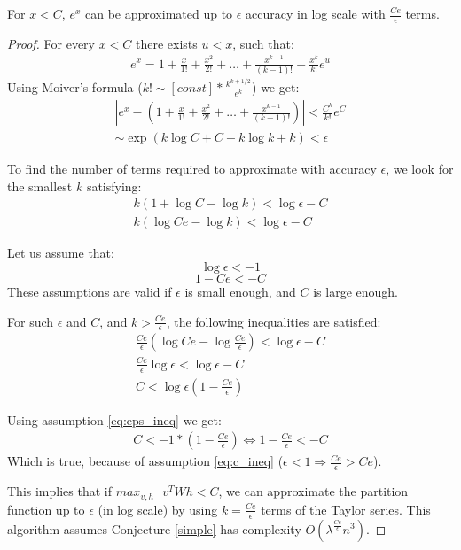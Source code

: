 \begin{lemma}
	For $x < C$, $e^x$ can be approximated up to $\epsilon$ accuracy in log scale with $\frac{Ce}{\epsilon}$ terms. 
\end{lemma}
\begin{proof}

For every $x < C$ there exists $u < x$, such that:  
\begin{align*}
	e^x = 1 + \frac{x}{1!} + \frac{x^2}{2!} + \dots + \frac{x^{k - 1}}{(k - 1)!} + \frac{x^k}{k!}e^u
\end{align*}
Using Moiver's formula ($k! \sim [const] * \frac{k^{k + 1/2}}{e^k}$) we get:
\begin{align*}
	|e^x - (1 + \frac{x}{1!} + \frac{x^2}{2!} + \dots + \frac{x^{k - 1}}{(k - 1)!}) | < \frac{C^k}{k!}e^C \\
	\sim \exp(k\log{C} + C - k\log{k} + k) < \epsilon
\end{align*}

To find the number of terms required to approximate with accuracy $\epsilon$, we look for 
the smallest $k$ satisfying: 
\begin{align*}
	k (1 + \log{C} - \log{k}) < \log{\epsilon} - C\\ 
	k (\log{Ce} - \log{k}) < \log{\epsilon} - C
\end{align*}

Let us assume that:
\begin{equation}
\label{eq:eps_ineq}
\log{\epsilon} < -1
\end{equation}
\begin{equation}
\label{eq:c_ineq}
1 - Ce < -C
\end{equation}
These assumptions are valid if $\epsilon$ is small enough, and $C$ is large enough.

For such $\epsilon$ and $C$, and $k > \frac{Ce}{\epsilon}$, the
following inequalities are satisfied:
\begin{align*}
	\frac{Ce}{\epsilon} (\log{Ce} - \log{\frac{Ce}{\epsilon}}) < \log{\epsilon} - C \\
	\frac{Ce}{\epsilon} \log{\epsilon} < \log{\epsilon} - C\\
	C < \log{\epsilon}(1 - \frac{Ce}{\epsilon})
\end{align*}

Using assumption \ref{eq:eps_ineq} we get:
\begin{align*}
  C < -1 * (1 - \frac{Ce}{\epsilon}) \Leftrightarrow 1 - \frac{Ce}{\epsilon} < -C
\end{align*}
Which is true, because of assumption \ref{eq:c_ineq} ($\epsilon < 1 \Rightarrow \frac{Ce}{\epsilon} > Ce$).

This implies that if $max_{v,h}\text{ } v^TWh < C$, we can
approximate the partition function up to $\epsilon$ (in log scale)
by using $k = \frac{Ce}{\epsilon}$ terms of the Taylor series. 
This algorithm assumes Conjecture \ref{simple} has complexity $O(\lambda^{\frac{Ce}{\epsilon}}n^3)$.

\vspace{-5mm}
\end{proof}
\vspace{-5mm}


